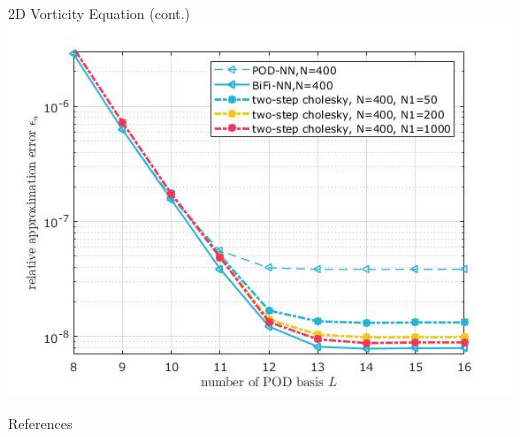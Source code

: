 \documentclass[10pt]{beamer}
\begin{document}
\begin{frame}{2D Vorticity Equation (cont.)}
\includegraphics[scale=0.5]{figures/two_step.jpg}

\end{frame}


\begin{frame}[allowframebreaks]{References}

  
  

\end{frame}
\end{document}
